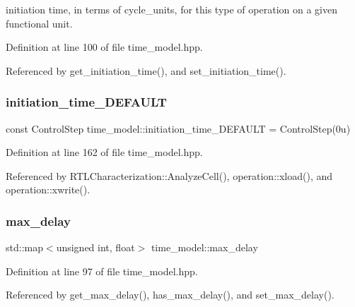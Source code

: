 initiation time, in terms of cycle\+\_\+units, for this type of operation on a given functional unit. 



Definition at line 100 of file time\+\_\+model.\+hpp.



Referenced by get\+\_\+initiation\+\_\+time(), and set\+\_\+initiation\+\_\+time().

\mbox{\label{classtime__model_a2980a7b7ec9e81d952719dde6336ded6}} 
\subsubsection{\texorpdfstring{initiation\+\_\+time\+\_\+\+D\+E\+F\+A\+U\+LT}{initiation\_time\_DEFAULT}}
{\footnotesize\ttfamily const Control\+Step time\+\_\+model\+::initiation\+\_\+time\+\_\+\+D\+E\+F\+A\+U\+LT = Control\+Step(0u)\hspace{0.3cm}{\ttfamily [static]}}



Definition at line 162 of file time\+\_\+model.\+hpp.



Referenced by R\+T\+L\+Characterization\+::\+Analyze\+Cell(), operation\+::xload(), and operation\+::xwrite().

\mbox{\label{classtime__model_a777fafc4e47a09494a73ce6ac0927a32}} 
\subsubsection{\texorpdfstring{max\+\_\+delay}{max\_delay}}
{\footnotesize\ttfamily std\+::map$<$unsigned int, float$>$ time\+\_\+model\+::max\+\_\+delay\hspace{0.3cm}{\ttfamily [protected]}}



Definition at line 97 of file time\+\_\+model.\+hpp.



Referenced by get\+\_\+max\+\_\+delay(), has\+\_\+max\+\_\+delay(), and set\+\_\+max\+\_\+delay().

